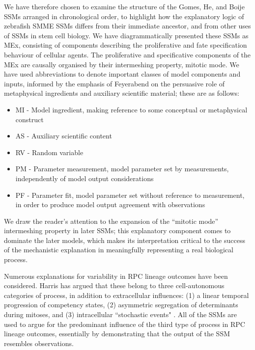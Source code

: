 \documentclass{ut-thesis}
\begin{document}
\begin{NoHyper}
We have therefore chosen to examine the structure of the Gomes, He, and Boije SSMs arranged in chronological order, to highlight how the explanatory logic of zebrafish SMME SSMs differs from their immediate ancestor, and from other uses of SSMs in stem cell biology. We have diagrammatically presented these SSMs as MEx, consisting of components describing the proliferative and fate specification behaviour of cellular agents. The proliferative and specificative components of the MEx are causally organised by their intermeshing property, mitotic mode. We have used abbreviations to denote important classes of model components and inputs, informed by the emphasis of Feyerabend on the persuasive role of metaphysical ingredients and auxiliary scientific material; these are as follows:

 \begin{itemize}
	\item{MI - Model ingredient, making reference to some conceptual or metaphysical construct}
	\item{AS - Auxiliary scientific content}
	\item{RV - Random variable}
	\item{PM - Parameter measurement, model parameter set by measurements, independently of model output considerations}
	\item{PF - Parameter fit, model parameter set without reference to measurement, in order to produce model output agreement with observations}
\end{itemize}

We draw the reader's attention to the expansion of the ``mitotic mode'' intermeshing property in later SSMs; this explanatory component comes to dominate the later models, which makes its interpretation critical to the success of the mechanistic explanation in meaningfully representing a real biological process. 

Numerous explanations for variability in RPC lineage outcomes have been considered. Harris has argued that these belong to three cell-autonomous categories of process, in addition to extracellular influences: (1) a linear temporal progression of competency states, (2) asymmetric segregation of determinants during mitoses, and (3) intracellular ``stochastic events" \cite{Holt1988,Agathocleous2009}. All of the SSMs are used to argue for the predominant influence of the third type of process in RPC lineage outcomes, essentially by demonstrating that the output of the SSM resembles observations.


\end{NoHyper}
\end{document}
